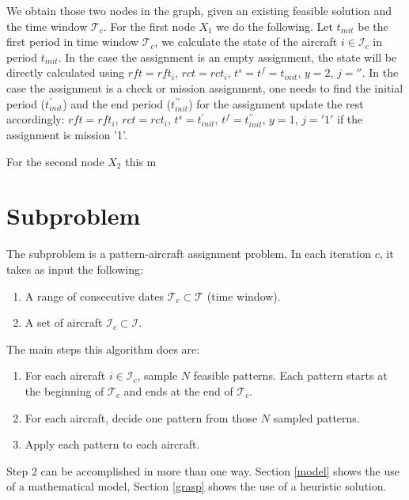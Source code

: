 \documentclass[a4paper,11pt]{article}
\begin{document}
    We obtain those two nodes in the graph, given an existing feasible solution and the time window $\mathcal{T}_{c}$.
    For the first node $X_1$ we do the following. Let $t_{init}$ be the first period in time window $\mathcal{T}_{c}$, we calculate the state of the aircraft $i \in \mathcal{I}_{c}$ in period $t_{init}$. In the case the assignment is an empty assignment, the state will be directly calculated using $rft=rft_i$, $rct=rct_i$, $t^s=t^f=t_{init}$, $y=2$, $j=''$. In the case the assignment is a check or mission assignment, one needs to find the initial period ($t^\prime_{init}$) and the end period ($t^{\prime\prime}_{init}$) for the assignment update the rest accordingly: $rft=rft_i$, $rct=rct_i$, $t^s=t^\prime_{init}$, $t^f=t^{\prime\prime}_{init}$, $y=1$, $j='1'$ if the assignment is mission '1'.

    For the second node $X_2$ this m

\section{Subproblem}

  The subproblem is a pattern-aircraft assignment problem. 
  In each iteration $c$, it takes as input the following:

  \begin{enumerate}
    \item A range of consecutive dates $\mathcal{T}_{c} \subset \mathcal{T}$ (time window).
    \item A set of aircraft $\mathcal{I}_{c} \subset \mathcal{I}$.
  \end{enumerate}
  
  The main steps this algorithm does are:

  \begin{enumerate}
    \item For each aircraft $i \in \mathcal{I}_{c}$, sample $N$ feasible patterns. Each pattern starts at the beginning of $\mathcal{T}_{c}$ and ends at the end of $\mathcal{T}_{c}$.
    \item For each aircraft, decide one pattern from those $N$ sampled patterns.
    \item Apply each pattern to each aircraft.
  \end{enumerate}

  Step 2 can be accomplished in more than one way. Section \ref{model} shows the use of a mathematical model, Section \ref{grasp} shows the use of a heuristic solution.
\end{document}
